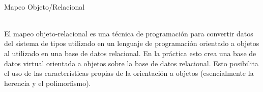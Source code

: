 \begin{flushleft}
\begin{itemize}
\textbf{}\\
Mapeo Objeto/Relacional

\textbf{}\\
El  mapeo  objeto-relacional  es  una  técnica  de  programación para  convertir  datos  del  sistema  de  tipos utilizado  en  un  lenguaje  de  programación  orientado  a  objetos  al  utilizado  en  una  base  de  datos relacional. En la práctica esto crea una base de datos virtual orientada a objetos sobre la base de datos relacional. Esto posibilita el uso de las características propias de la orientación a objetos (esencialmente la herencia y el polimorfismo).


\end{itemize} 


\end{flushleft}